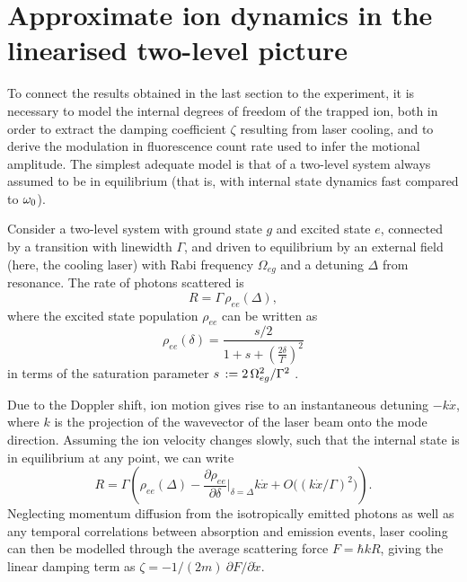 \documentclass[pra,twocolumn]{revtex4-2}
\begin{document}
\section{Approximate ion dynamics in the linearised two-level picture}
\label{sec:cooling}

To connect the results obtained in the last section to the experiment, it is necessary to model the internal degrees of freedom of the trapped ion, both in order to extract the damping coefficient $\zeta$ resulting from laser cooling, and to derive the modulation in fluorescence count rate used to infer the motional amplitude.
The simplest adequate model is that of a two-level system always assumed to be in equilibrium (that is, with internal state dynamics fast compared to $\omega_{\textrm{0}}$).


Consider a two-level system with ground state $g$ and excited state $e$, connected by a transition with linewidth $\Gamma$, and driven to equilibrium by an external field (here, the cooling laser) with Rabi frequency $\Omega_{eg}$ and a detuning $\Delta$ from resonance.
The rate of photons scattered is
\begin{equation}
	R = \Gamma \, \rho_{ee}(\Delta),
\end{equation}
where the excited state population $\rho_{ee}$ can be written as
\begin{equation}
	\rho_{ee}(\delta) = \frac{s / 2}{1 + s + \left(\frac{2\delta}{\Gamma}\right)^2}
\end{equation}
in terms of the saturation parameter $s\, := 2\, \Omega_{eg}^2 / \Gamma^2$ \cite{Leibfried2003}.

Due to the Doppler shift, ion motion gives rise to an instantaneous detuning $-k \dot{x}$, where $k$ is the projection of the wavevector of the laser beam onto the mode direction.
Assuming the ion velocity changes slowly, such that the internal state is in equilibrium at any point, we can write
\begin{equation}
	R = \Gamma \left(\rho_{ee}(\Delta) - \frac{\partial \rho_{ee}}{\partial \delta}\Bigr|_{\delta=\Delta} k \dot{x} + O\big((k \dot{x} / \Gamma)^2 \big)\right).
\end{equation}
Neglecting momentum diffusion from the isotropically emitted photons as well as any temporal correlations between absorption and emission events, laser cooling can then be modelled through the average scattering force $F = \hbar k R$, giving the linear damping term as $\zeta = -1/(2 m)\ \partial F / \partial \dot{x}$.
\end{document}
